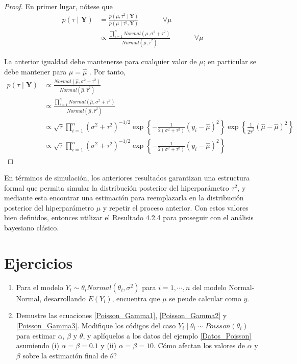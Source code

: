 \begin{proof}
En primer lugar, nótese que
\begin{align*}
p(\tau \mid \mathbf{Y})&= \frac{p(\mu,\tau^2 \mid \mathbf{Y})}{p(\mu \mid \tau^2,\mathbf{Y})}
\ \ \ \ \ \ \ \ \ \ \ \ \ \ \ \forall \mu \\
&\propto \frac{\prod_{i=1}^n Normal(\mu,\sigma^2+\tau^2)}{Normal(\hat{\mu},\hat{\tau}^2)}
\ \ \ \ \ \ \ \ \ \ \ \ \ \ \ \forall \mu
\end{align*}

La anterior igualdad debe mantenerse para cualquier valor de $\mu$; en particular se debe mantener para $\mu=\hat{\mu}$ \cite{Gelman03}. Por tanto,
\begin{align*}
p(\tau \mid \mathbf{Y}) &\propto \frac{Normal(\hat{\mu},\sigma^2+\tau^2)}{Normal(\hat{\mu},\hat{\tau}^2)}\\
&\propto \frac{\prod_{i=1}^n Normal(\hat{\mu},\sigma^2+\tau^2)}{Normal(\hat{\mu},\hat{\tau}^2)}\\
&\propto \sqrt{\hat{\tau}}\prod_{i=1}^n (\sigma^2+\tau^2)^{-1/2}\exp\left\{-\frac{1}{2(\sigma^2+\tau^2)}(y_i-\hat{\mu})^2\right\} \exp\left\{\frac{1}{2\hat{\tau}^2}(\hat{\mu}-\hat{\mu})^2\right\}\\
&\propto \sqrt{\hat{\tau}}\prod_{i=1}^n (\sigma^2+\tau^2)^{-1/2}\exp\left\{-\frac{1}{2(\sigma^2+\tau^2)}(y_i-\hat{\mu})^2\right\}
\end{align*}
\end{proof}

En términos de simulación, los anteriores resultados garantizan una estructura formal que permita simular la distribución posterior del hiperparámetro $\tau^2$, y mediante esta encontrar una estimación para reemplazarla en la distribución posterior del hiperparámetro $\mu$ y repetir el proceso anterior. Con estos valores bien definidos, entonces utilizar el Resultado 4.2.4 para proseguir con el análisis bayesiano clásico. 

\section{Ejercicios}
\begin{enumerate}
\item Para el modelo $Y_i\sim\theta_i Normal(\theta_i,\sigma^2)$ para $i=1,\cdots,n$ del modelo Normal-Normal, desarrollando $E(Y_i)$, encuentra que $\mu$ se peude calcular como $\bar{y}$.
\item Demustre las ecuaciones \ref{Poisson_Gamma1}, \ref{Poisson_Gamma2} y \ref{Poisson_Gamma3}. Modifique los códigos del caso $Y_i\mid\theta_i\sim Poisson(\theta_i)$ para estimar $\alpha$, $\beta$ y $\theta$, y aplíquelos a los datos del ejemplo \ref{Datos_Poisson} asumiendo (i) $\alpha=\beta=0.1$ y (ii) $\alpha=\beta=10$. Cómo afectan los valores de $\alpha$ y $\beta$ sobre la estimación final de $\theta$?
\end{enumerate}
